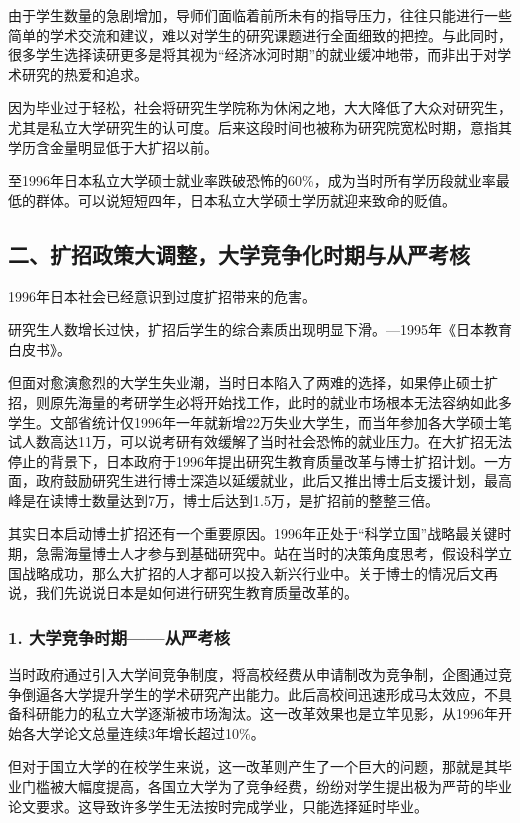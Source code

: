 由于学生数量的急剧增加，导师们面临着前所未有的指导压力，往往只能进行一些简单的学术交流和建议，难以对学生的研究课题进行全面细致的把控。与此同时，很多学生选择读研更多是将其视为“经济冰河时期”的就业缓冲地带，而非出于对学术研究的热爱和追求。

因为毕业过于轻松，社会将研究生学院称为休闲之地，大大降低了大众对研究生，尤其是私立大学研究生的认可度。后来这段时间也被称为研究院宽松时期，意指其学历含金量明显低于大扩招以前。

至1996年日本私立大学硕士就业率跌破恐怖的60\%，成为当时所有学历段就业率最低的群体。可以说短短四年，日本私立大学硕士学历就迎来致命的贬值。

\subsection{二、扩招政策大调整，大学竞争化时期与从严考核}

1996年日本社会已经意识到过度扩招带来的危害。

{\fangsong 研究生人数增长过快，扩招后学生的综合素质出现明显下滑。—1995年《日本教育白皮书》。\par}

但面对愈演愈烈的大学生失业潮，当时日本陷入了两难的选择，如果停止硕士扩招，则原先海量的考研学生必将开始找工作，此时的就业市场根本无法容纳如此多学生。文部省统计仅1996年一年就新增22万失业大学生，而当年参加各大学硕士笔试人数高达11万，可以说考研有效缓解了当时社会恐怖的就业压力。在大扩招无法停止的背景下，日本政府于1996年提出研究生教育质量改革与博士扩招计划。一方面，政府鼓励研究生进行博士深造以延缓就业，此后又推出博士后支援计划，最高峰是在读博士数量达到7万，博士后达到1.5万，是扩招前的整整三倍。

其实日本启动博士扩招还有一个重要原因。1996年正处于“科学立国”战略最关键时期，急需海量博士人才参与到基础研究中。站在当时的决策角度思考，假设科学立国战略成功，那么大扩招的人才都可以投入新兴行业中。关于博士的情况后文再说，我们先说说日本是如何进行研究生教育质量改革的。

\subsubsection{1. 大学竞争时期——从严考核}

当时政府通过引入大学间竞争制度，将高校经费从申请制改为竞争制，企图通过竞争倒逼各大学提升学生的学术研究产出能力。此后高校间迅速形成马太效应，不具备科研能力的私立大学逐渐被市场淘汰。这一改革效果也是立竿见影，从1996年开始各大学论文总量连续3年增长超过10\%。

但对于国立大学的在校学生来说，这一改革则产生了一个巨大的问题，那就是其毕业门槛被大幅度提高，各国立大学为了竞争经费，纷纷对学生提出极为严苛的毕业论文要求。这导致许多学生无法按时完成学业，只能选择延时毕业。

